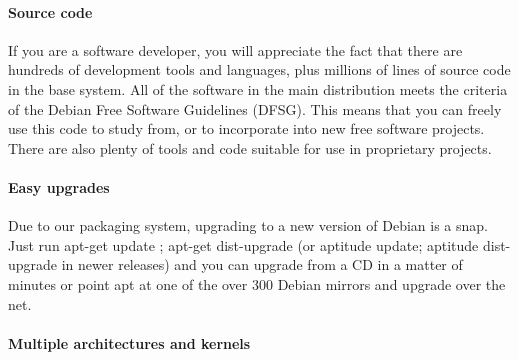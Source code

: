 \documentclass[letterpaper,landscape]{report}
\begin{document}
\begin{multicols}{3}
\paragraph{Source code}

If you are a software developer, you will appreciate the fact that there are
hundreds of development tools and languages, plus millions of lines of source
code in the base system. All of the software in the main distribution meets the
criteria of the Debian Free Software Guidelines (DFSG). This means that you can
freely use this code to study from, or to incorporate into new free software
projects. There are also plenty of tools and code suitable for use in
proprietary projects.

\paragraph{Easy upgrades}

Due to our packaging system, upgrading to a new version of Debian is a snap.
Just run apt-get update ; apt-get dist-upgrade (or aptitude update; aptitude
dist-upgrade in newer releases) and you can upgrade from a CD in a matter of
minutes or point apt at one of the over 300 Debian mirrors and upgrade over the
net.


\paragraph{Multiple architectures and kernels}


\end{multicols}
\end{document}
